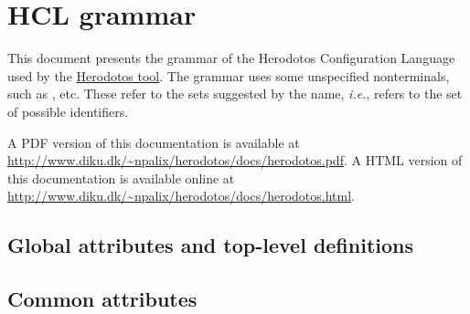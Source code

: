 
\chapter{HCL grammar}
\label{sec:hcl-grammar}

This document presents the grammar of the Herodotos Configuration
Language used by the
\href{http://www.diku.dk/~npalix/herodotos/}{Herodotos tool}.  The
grammar uses some unspecified nonterminals, such as , etc.
These refer to the sets suggested by the name, {\em i.e.}, 
refers to the set of possible identifiers.

\ifhevea
A PDF version of this documentation is available at
\url{http://www.diku.dk/~npalix/herodotos/docs/herodotos.pdf}.
\else
A HTML version of this documentation is available online at
\url{http://www.diku.dk/~npalix/herodotos/docs/herodotos.html}.
\fi

\section{Global attributes and top-level definitions}
\label{sec:globattr}

  \begin{grammar}




  \end{grammar}

\section{Common attributes}
\label{sec:commonattr}

  \begin{grammar}
  \end{grammar}

